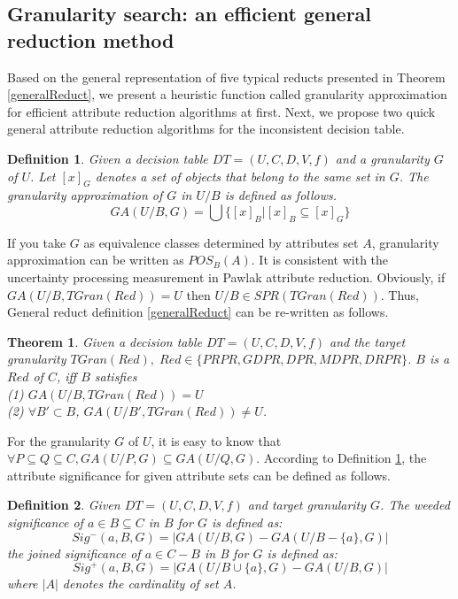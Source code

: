 \documentclass[review]{elsarticle}
\newtheorem{myDef}{Definition}
\newtheorem{myTheo}{Theorem}
\begin{document}
	\subsection{Granularity search: an efficient general reduction method}\label{subsection.gs}
	\par Based on the general representation of five typical reducts presented in Theorem \ref{generalReduct}, we present a heuristic function called granularity approximation for efficient attribute reduction algorithms at first. Next, we propose two quick general attribute reduction algorithms for the inconsistent decision table.
	\begin{myDef}\label{granularityApproximation}
		Given a decision table $DT=(U,C,D,V,f)$ and a granularity $G$ of $U$. Let $[x]_G$ denotes a set of objects that belong to the same set in $G$. The granularity approximation of $G$ in $U/B$ is defined as follows.
		\begin{equation}
		GA(U/B,G) = \bigcup \{[x]_B|[x]_B \subseteq [x]_G\}
		\end{equation}
	\end{myDef}
	If you take $G$ as equivalence classes determined by attributes set $A$, granularity approximation can be written as $POS_B(A)$. It is consistent with the uncertainty processing measurement in Pawlak attribute reduction. Obviously, if $GA(U/B, TGran(Red))=U$ then $U/B \in SPR(TGran(Red))$. Thus, General reduct definition \ref{generalReduct} can be re-written as follows.
	\begin{myTheo}
		Given a decision table $DT=(U,C,D,V,f)$ and the target granularity $TGran(Red), \; Red \in \{PRPR, GDPR, DPR, MDPR, DRPR\}$. $B$ is a $Red$ of $C$, iff $B$ satisfies \\
		\rm{(1)} $GA(U/B,TGran(Red))=U$\\
		\rm{(2)} $\forall B' \subset B$, $GA(U/B',TGran(Red)) \neq U$.%
	\end{myTheo}
	For the granularity $G$ of $U$, it is easy to know that $\forall P \subseteq Q \subseteq C, GA(U/P,G) \subseteq GA(U/Q,G)$. According to Definition \ref{granularityApproximation}, the attribute significance for given attribute sets can be defined as follows.
	\begin{myDef}
		Given $DT=(U,C,D,V,f)$ and target granularity $G$. The weeded significance of $a \in B\subseteq C$ in $B$ for $G$ is defined as:
		\begin{equation}
		Sig^-(a,B,G)=|GA(U/B,G)-GA(U/B-\{a\},G)|
		\end{equation}
		the joined significance of $a \in C-B$ in B for $G$ is defined as:
		\begin{equation}
		Sig^+(a,B,G)=|GA(U/B\cup \{a\},G)-GA(U/B,G)|
		\end{equation}
		where $|A|$ denotes the cardinality of set $A$.
	\end{myDef}
\end{document}

